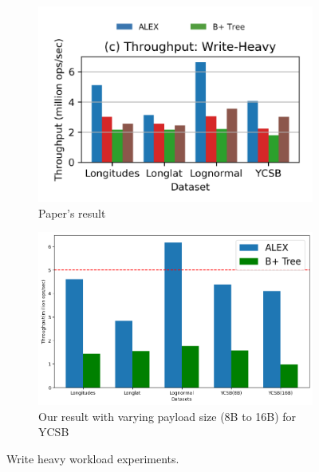\documentclass[12pt,a4paper]{article}
\begin{document}
\begin{figure}[htbp]
    \centering

    \begin{subfigure}{0.3\textwidth}
        \includegraphics[width=\linewidth]{Figures/write heavy.png}
        \caption{Paper's result}
        \label{paper's result write heavy}
    \end{subfigure}
    \begin{subfigure}{0.3\textwidth}
        \includegraphics[width=\linewidth]{Figures/Writeheavy.png }
        \caption{Our result with varying payload size (8B to 16B) for YCSB}
        \label{Our result with varying payload size (8B to 16B) for YCSB}
    \end{subfigure}
  

    \caption{Write heavy workload experiments.}
\end{figure}
\end{document}
